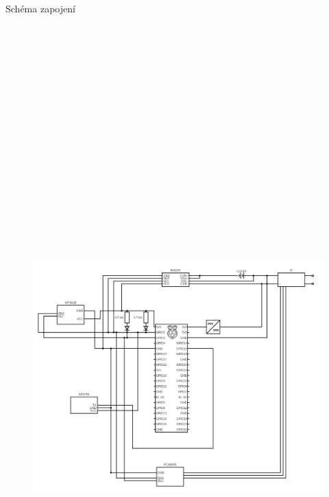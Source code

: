 \documentclass[final]{beamer}
\newlength{\colwidth}
\begin{document}
\begin{frame}[t]
\begin{columns}[t]
\begin{column}{\colwidth}
\begin{block}{Schéma zapojení}
				\begin{figure}[h]
					\centering
					\includegraphics[height=27cm]{../img/schema.png}
				\end{figure}



\end{block}
\end{column}
\end{columns}
\end{frame}
\end{document}
